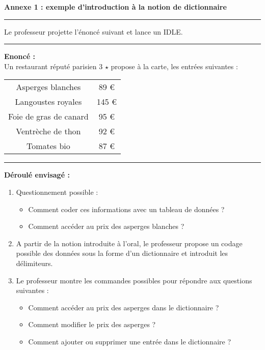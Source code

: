 \documentclass[12pt,french]{article}
\begin{document}
\chead{}
\renewcommand{\headrulewidth}{0.5pt}
\lfoot{                      }
\pagestyle{fancy}
\renewcommand{\footrulewidth}{0.4pt}
\begin{center}
	\large{\textbf{Annexe 1 : exemple d'introduction à la notion de dictionnaire}}
\end{center} 
\hrule
\begin{center}
Le professeur projette l'énoncé suivant et lance un IDLE.\\
\end{center} 
\hrule
\vskip0.1cm 
\textbf{Enoncé :}\\
Un restaurant réputé parisien 3 $\star$ propose à la carte, les entrées suivantes : \\
\begin{tabular}{c|c}
Asperges blanches&89 \euro\\
Langoustes royales&145 \euro\\	
Foie de gras de canard&95 \euro\\
Ventrèche de thon&92 \euro\\
Tomates bio&87 \euro\\
\end{tabular}
\hrule
\vskip0.1cm 
\textbf{Déroulé envisagé :}
\begin{enumerate}
\item Questionnement possible : 
\begin{itemize}[$\bullet$]
\item Comment coder ces informations avec un tableau de données ?
\item Comment accéder au prix des asperges blanches ?
\end{itemize}
\item A partir de la notion introduite à l'oral, le professeur propose un codage possible des données sous la forme d'un dictionnaire et introduit les délimiteurs.
\item Le professeur montre les commandes possibles pour répondre aux questions suivantes :
\begin{itemize}[$\bullet$]
\item  Comment accéder au prix des asperges dans le dictionnaire ?
\item Comment modifier le prix des asperges ?
\item Comment ajouter ou supprimer une entrée dans le dictionnaire ?
\end{itemize}
\end{enumerate}
\end{document}
